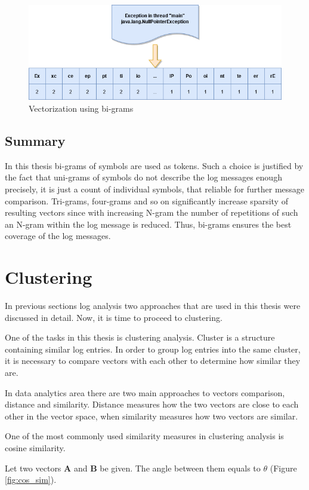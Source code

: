 \documentclass[thesis=M,english]{FITthesis}[2019/12/23]
\begin{document}
\begin{figure}[h!]\centering
	\includegraphics[scale=0.48]{bi_grams_vec}
	\caption{Vectorization using bi-grams}\label{fig:bi-grams-vec}
\end{figure}


\subsection{Summary}
In this thesis bi-grams of symbols are used as tokens. Such a choice is justified by the fact that uni-grams of symbols do not describe the log messages enough precisely, it is just a count of individual symbols, that reliable for further message comparison. Tri-grams, four-grams and so on significantly increase sparsity of resulting vectors since with increasing N-gram the number of repetitions of such an N-gram within the log message is reduced. Thus, bi-grams ensures the best coverage of the log messages.

\section{Clustering}
In previous sections log analysis two approaches that are used in this thesis were discussed in detail. Now, it is time to proceed to clustering.

One of the tasks in this thesis is clustering analysis. Cluster is a structure containing similar log entries. In order to group log entries into the same cluster, it is necessary to compare vectors with each other to determine how similar they are.

In data analytics area there are two main approaches to vectors comparison, distance and similarity. Distance measures how the two vectors are close to each other in the vector space, when similarity measures how two vectors are similar.

One of the most commonly used similarity measures in clustering analysis is cosine similarity.

Let two vectors \textbf{A} and \textbf{B} be given. The angle between them equals to \(\theta\) (Figure \ref{fig:cos_sim}). 
\end{document}
